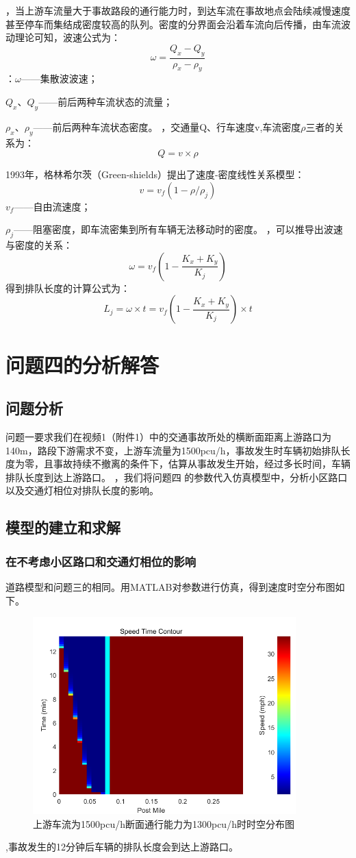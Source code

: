 \documentclass[UTF8,12.05pt]{ctexart}
\begin{document}
，当上游车流量大于事故路段的通行能力时，到达车流在事故地点会陆续减慢速度甚至停车而集结成密度较高的队列。密度的分界面会沿着车流向后传播，由车流波动理论\cite{par}可知，波速公式为：
$$\omega=\frac{Q_{x}-Q_{y}}{\rho_{x}-\rho_{y}}$$
：$\omega$——集散波波速；
\par $Q_{x}$、$Q_{y}$——前后两种车流状态的流量；
\par $\rho_{x}$、$\rho_{y}$——前后两种车流状态密度。
，交通量Q、行车速度v,车流密度$\rho$三者的关系为：
$$Q=v\times\rho$$
\par 1993年，格林希尔茨（Green-shields）提出了速度-密度线性关系模型：
$$v=v_{f}(1-\rho/\rho_{j})$$
$v_{f}$——自由流速度；
\par$\rho_{j}$——阻塞密度，即车流密集到所有车辆无法移动时的密度。
，可以推导出波速与密度的关系：
$$\omega=v_{f}(1-\frac{K_{x}+K_{y}}{K_{j}})$$
得到排队长度的计算公式为：
$$L_{j}=\omega\times t= v_{f}(1-\frac{K_{x}+K_{y}}{K_{j}})\times t$$
\section{\heiti{}问题四的分析解答}
\subsection{问题分析}
问题一要求我们在视频1（附件1）中的交通事故所处的横断面距离上游路口为140m，路段下游需求不变，上游车流量为1500pcu/h，事故发生时车辆初始排队长度为零，且事故持续不撤离的条件下，估算从事故发生开始，经过多长时间，车辆排队长度到达上游路口。
，我们将问题四 的参数代入仿真模型中，分析小区路口以及交通灯相位对排队长度的影响。

\subsection{模型的建立和求解}
\subsubsection{在不考虑小区路口和交通灯相位的影响}
道路模型和问题三的相同。用MATLAB对参数进行仿真，得到速度时空分布图如下。
\begin{figure}[H]
  \centering
  \includegraphics[width=4.00in]{13001500.png}
  \caption{上游车流为1500pcu/h断面通行能力为1300pcu/h时时空分布图}
\end{figure}
,事故发生的12分钟后车辆的排队长度会到达上游路口。
\end{document}
